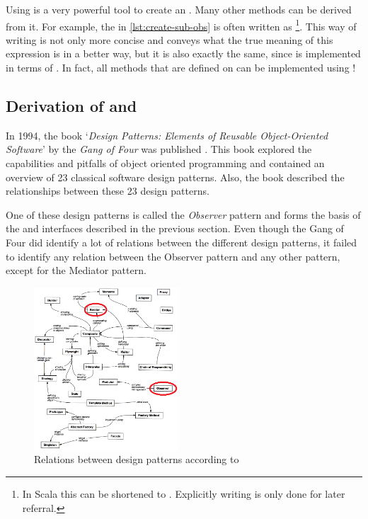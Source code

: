 Using  is a very powerful tool to create an \obs. Many other methods can be derived from it. For example, the \obs in \autoref{lst:create-sub-obs} is often written as \footnote{In Scala this can be shortened to . Explicitly writing  is only done for later referral.}. This way of writing is not only more concise and conveys what the true meaning of this expression is in a better way, but it is also exactly the same, since  is implemented in terms of . In fact, all methods that are defined on \obs can be implemented using !

\subsection{Derivation of \obs and \obv}
\label{subsec:derivation}
In 1994, the book `\textit{Design Patterns: Elements of Reusable Object-Oriented Software}' by the \textit{Gang of Four} was published \cite{gamma1994-DesignPatternsGOF}. This book explored the capabilities and pitfalls of object oriented programming and contained an overview of 23 classical software design patterns. Also, the book described the relationships between these 23 design patterns.

One of these design patterns is called the \textit{Observer} pattern and forms the basis of the \obs and \obv interfaces described in the previous section. Even though the Gang of Four did identify a lot of relations between the different design patterns, it failed to identify any relation between the Observer pattern and any other pattern, except for the Mediator pattern.

\begin{figure}[H]
	\begin{center}
		\includegraphics[width=0.48\textwidth]{figures/DesignPatternRelationships_bew.png}
	\end{center}
	\label{fig:designPatternRelationships}
	\caption{Relations between design patterns according to \cite{gamma1994-DesignPatternsGOF}}
\end{figure}

